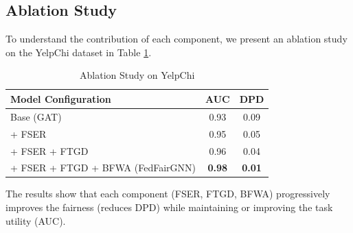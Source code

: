 \subsection{Ablation Study}
To understand the contribution of each component, we present an ablation study on the YelpChi dataset in Table \ref{tab:ablation}. 
\begin{table}[htbp]
\caption{Ablation Study on YelpChi}
\begin{center}
\begin{tabular}{lcc}
\toprule
Model Configuration & AUC & DPD \\
\midrule
Base (GAT) & 0.93 & 0.09 \\
+ FSER & 0.95 & 0.05 \\
+ FSER + FTGD & 0.96 & 0.04 \\
+ FSER + FTGD + BFWA (FedFairGNN) & \textbf{0.98} & \textbf{0.01} \\
\bottomrule
\end{tabular}
\label{tab:ablation}
\end{center}
\end{table}
The results show that each component (FSER, FTGD, BFWA) progressively improves the fairness (reduces DPD) while maintaining or improving the task utility (AUC).
